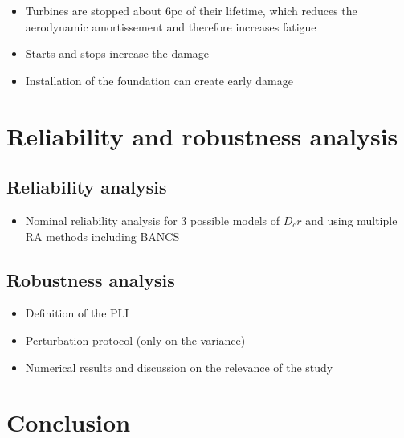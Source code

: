 \begin{itemize}
    \item Turbines are stopped about 6pc of their lifetime, which reduces the aerodynamic amortissement and therefore increases fatigue
    \item Starts and stops increase the damage
    \item Installation of the foundation can create early damage
\end{itemize}

\section{Reliability and robustness analysis}


\subsection{Reliability analysis}
\begin{itemize}
    \item Nominal reliability analysis for 3 possible models of $D_cr$ and using multiple RA methods including BANCS
\end{itemize}

\subsection{Robustness analysis}
\begin{itemize}
    \item Definition of the PLI
    \item Perturbation protocol (only on the variance)
    \item Numerical results and discussion on the relevance of the study  
\end{itemize}


\section{Conclusion}




